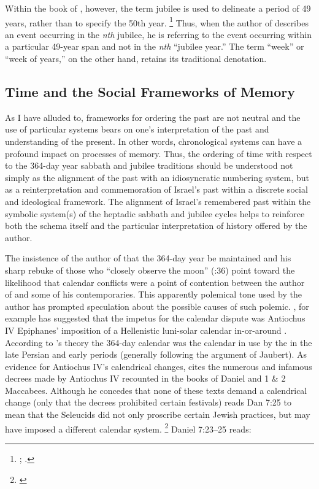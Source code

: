 Within the book of \jub, however, the term jubilee is used to delineate a period of 49 years, rather than to specify the 50th year.%
    \footnote{%
        \cite[524--525]{vanderkam-b_vanderkam2000};
        \cite[234]{bergsma2007}.}
Thus, when the author of \jub describes an event occurring in the \emph{nth} jubilee, he is referring to the event occurring within a particular 49-year span and not in the \emph{nth} ``jubilee year.'' The term ``week'' or ``week of years,'' on the other hand, retains its traditional denotation.


\subsection{Time and the Social Frameworks of Memory}
As I have alluded to, frameworks for ordering the past are not neutral and the use of particular systems bears on one's interpretation of the past and understanding of the present. In other words, chronological systems can have a profound impact on processes of memory. Thus, the ordering of time with respect to the 364-day year sabbath and jubilee traditions should be understood not simply as the alignment of the past with an idiosyncratic numbering system, but as a reinterpretation and commemoration of Israel's past within a discrete social and ideological framework. The alignment of Israel's remembered past within the symbolic system(s) of the heptadic sabbath and jubilee cycles helps to reinforce both the schema itself and the particular interpretation of history offered by the author.

The insistence of the author of \jub that the 364-day year be maintained and his sharp rebuke of those who ``closely observe the moon'' (:36) point toward the likelihood that calendar conflicts were a point of contention between the author of \jub and some of his contemporaries. This apparently polemical tone used by the author has prompted speculation about the possible causes of such polemic. \vanderkam, for example has suggested that the impetus for the calendar dispute was Antiochus IV Epiphanes' imposition of a Hellenistic luni-solar calendar in-or-around . According to \vanderkam's theory the 364-day calendar was the calendar in use by the \jerusalemtemple in the late Persian and early \secondtemple periods (generally following the argument of Jaubert). As evidence for Antiochus IV's calendrical changes, \vanderkam cites the numerous and infamous decrees made by Antiochus IV recounted in the books of Daniel and 1 \& 2 Maccabees. Although he concedes that none of these texts demand a calendrical change (only that the decrees prohibited certain festivals) \vanderkam reads Dan 7:25 to mean that the Seleucids did not only proscribe certain Jewish practices, but may have imposed a different calendar system.%
    \footnote{\Cite[59--60; 68--69]{vanderkam_jsj1981}}
Daniel 7:23--25 reads:

